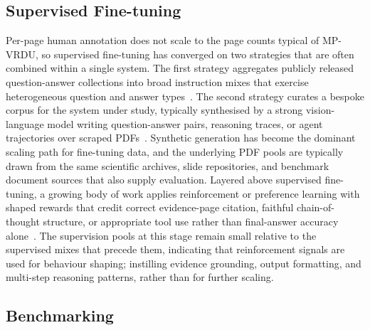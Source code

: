 \documentclass[11pt]{article}
\begin{document}
\subsection{Supervised Fine-tuning}
\label{app:dataset-sft}
Per-page human annotation does not scale to the page counts typical of MP-VRDU, so supervised fine-tuning has converged on two strategies that are often combined within a single system. The first strategy aggregates publicly released question-answer collections into broad instruction mixes that exercise heterogeneous question and answer types~\cite{tanaka2024instructdoc,jia2024leopard,hu2025mplug2,duan2025docopilot,ding2025synjac}. The second strategy curates a bespoke corpus for the system under study, typically synthesised by a strong vision-language model writing question-answer pairs, reasoning traces, or agent trajectories over scraped PDFs~\cite{xie2026wukong,tanaka2025vdocrag,wu2025molorag,zhang2026docdancer,guo2026end}. Synthetic generation has become the dominant scaling path for fine-tuning data, and the underlying PDF pools are typically drawn from the same scientific archives, slide repositories, and benchmark document sources that also supply evaluation. Layered above supervised fine-tuning, a growing body of work applies reinforcement or preference learning with shaped rewards that credit correct evidence-page citation, faithful chain-of-thought structure, or appropriate tool use rather than final-answer accuracy alone~\cite{xiong2026docr1,guo2026end,yan2025docseeker,lin2026mmdocr1,xu2026mmr5,wang2026vragrl}. The supervision pools at this stage remain small relative to the supervised mixes that precede them, indicating that reinforcement signals are used for behaviour shaping; instilling evidence grounding, output formatting, and multi-step reasoning patterns, rather than for further scaling.

\subsection{Benchmarking}
\label{app:dataset-bm}
\end{document}
